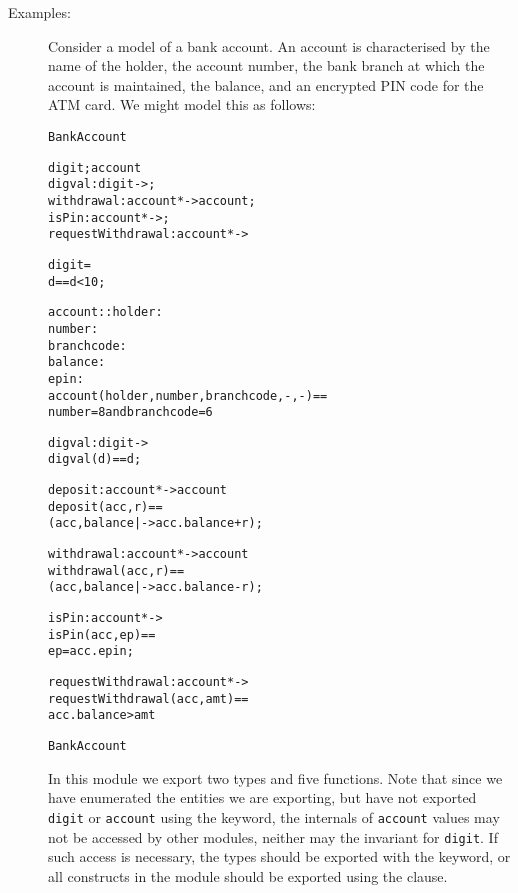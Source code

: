 \documentclass[\pformat,12pt]{article}
\begin{document}
\begin{description}
\item[Examples:] Consider a model of a bank account. An account is
characterised by the name of the holder, the account number, the
bank branch at which the account is maintained, the balance, and an
encrypted PIN code for the ATM card. We might model this as follows:
\begin{alltt}
 BankAccount

    digit; account
           digval: digit -> ;
                  withdrawal: account *  -> account;
                  isPin: account *  -> ;
                  requestWithdrawal: account *  -> 


  digit = 
   d == d < 10;
  
  account::  holder : 
             number : 
             branchcode : 
             balance: 
             epin: 
  account(holder, number, branchcode,-,-) ==
     number = 8 and  branchcode = 6


    digval : digit -> 
    digval(d) == d;

    deposit: account *  -> account
    deposit(acc,r) == 
      (acc,balance |-> acc.balance + r);

    withdrawal : account *  -> account
    withdrawal (acc,r) == 
      (acc,balance |-> acc.balance - r);

    isPin : account *  -> 
    isPin(acc,ep) ==
      ep = acc.epin;

    requestWithdrawal : account *  -> 
    requestWithdrawal (acc,amt) ==
      acc.balance > amt

 BankAccount
\end{alltt}
In this module we export two types and five functions. Note that since
we have enumerated the entities we are exporting, but have not
exported \texttt{digit} or \texttt{account} using the 
keyword, the internals of \texttt{account} values may not be accessed
by other modules, neither may the invariant for \texttt{digit}. If 
such access is necessary, the types should be exported with the
 keyword, or all constructs in the module should be
exported using the  clause.


\end{description}
\end{document}
